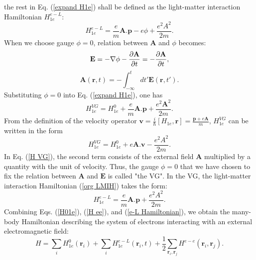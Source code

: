 \documentclass[12pt,english,a4paper]{article}
\begin{document}
the rest in Eq. (\ref{expand H1e}) shall be defined as the light-matter interaction Hamiltonian $H^{e-L}_{1e}$:
	\begin{equation}
		\label{org LMIH}
		H^{e-L}_{1e} =\frac{e}{m} \textbf{A}.\textbf{p} - e\phi + \frac{e^2 A^2}{2m}.
	\end{equation}
\quad When we choose gauge $\phi = 0$, relation between $\textbf{A}$ and $\phi$ becomes:
	\begin{equation}
		\textbf{E} = - \nabla \phi - \pdv{\textbf{A}}{t} = - \pdv{\textbf{A}}{t},
	\end{equation}
	\begin{equation}
		\textbf{A}(\textbf{r},t) = -\int_{-\infty}^t dt' \textbf{E}(\textbf{r}, t'). 
	\end{equation}
\quad Substituting $\phi = 0$ into Eq. (\ref{expand H1e}), one has
	\begin{equation}
		H^{VG}_{1e}= H^0_{1e} + \frac{e}{m}\textbf{A}.\textbf{p} + \frac{e^2\textbf{A}^2}{2m}.
	\end{equation}
\quad From the definition of the velocity operator $\textbf{v}= \frac{i}{\hbar} [H_{1e}, \textbf{r}] = \frac{\textbf{p}+e\textbf{A}}{m}$, $H^{VG}_{1e}$ can be written in the form
	\begin{equation}
		\label{H VG}
		H^{VG}_{1e} = H^0_{1e} + e \textbf{A}.\textbf{v} - \frac{e^2A^2}{2m}.
	\end{equation}
\quad In Eq. (\ref{H VG}), the second term consists of the external field $\textbf{A}$ multiplied by a quantity with the unit of velocity. Thus, the gauge $\phi = 0$ that we have chosen to fix the relation between $\textbf{A}$ and $\textbf{E}$ is called "the \ac{VG}". In the VG, the light-matter interaction Hamiltonian (\ref{org LMIH}) takes the form:
	\begin{equation}
		\label{e-L Hamiltonian}
		H^{e-L}_{1e} =\frac{e}{m} \textbf{A}.\textbf{p} + \frac{e^2 A^2}{2m}.
	\end{equation}
\quad Combining Eqs. (\ref{H01e}), (\ref{H ee}), and (\ref{e-L Hamiltonian}), we obtain the many-body Hamiltonian describing the system of electrons interacting with an external electromagnetic field:
	\begin{equation}
		\label{1st Quanti}
		H =  \sum_{i} H^0_{1e} (\textbf{r}_i) + \sum_{i} H^{e-L}_{1e} (\textbf{r}_i,t) + \frac{1}{2} \sum_{\textbf{r}_i, \textbf{r}_j}H^{e-e}(\textbf{r}_i, \textbf{r}_j).
	\end{equation}
\end{document}
